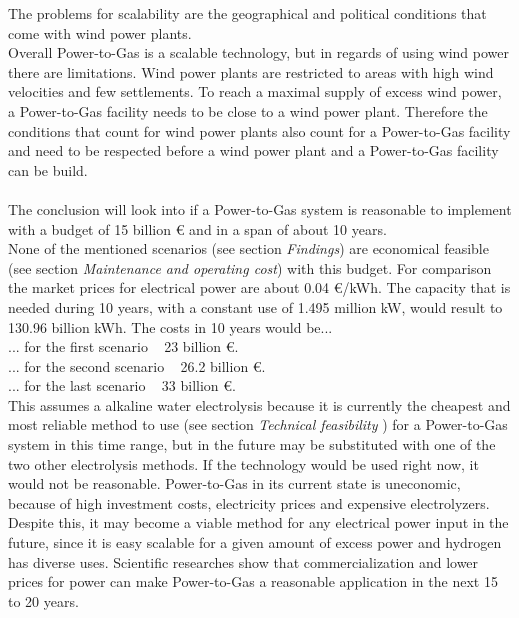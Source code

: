 \begin{parcolumns}[colwidths={1=2.5 cm, 2=10 cm, 3=2.5 cm}]{3}
{The problems for scalability are the geographical and political conditions that come with wind power plants.\\
Overall Power-to-Gas is a scalable technology, but in regards of using wind power there are limitations. Wind power plants are restricted to areas with high wind velocities and few settlements. To reach a maximal supply of excess wind power, a Power-to-Gas facility needs to be close to a wind power plant. Therefore the conditions that count for wind power plants also count for a Power-to-Gas facility and need to be respected before a wind power plant and a Power-to-Gas facility can be build.\\ \\
The conclusion will look into if a Power-to-Gas system is reasonable to implement with a budget of 15 billion \euro{ } and in a span of about 10 years.\\
None of the mentioned scenarios (see section \textit{Findings}) are economical feasible (see section \textit{Maintenance and operating cost}) with this budget. For comparison the market prices for electrical power are about 0.04 \euro /kWh. The capacity that is needed during 10 years, with a constant use of 1.495 million kW, would result to 130.96 billion kWh. The costs in 10 years would be... \\
... for the first scenario ~ 23 billion \euro .\\
... for the second scenario ~ 26.2 billion \euro .\\
... for the last scenario ~ 33 billion \euro . \\
This assumes a alkaline water electrolysis because it is currently the cheapest and most reliable method to use (see section \textit{Technical feasibility} ) for a Power-to-Gas system in this time range, but in the future may be substituted with one of the two other electrolysis methods.
If the technology would be used right now, it would not be reasonable. Power-to-Gas in its current state is uneconomic, because of high investment costs, electricity prices and expensive electrolyzers. Despite this, it may become a viable method for any electrical power input in the future, since it is easy scalable for a given amount of excess power and hydrogen has diverse uses. Scientific researches show that commercialization and lower prices for power can make Power-to-Gas a reasonable application in the next 15 to 20 years.
}


\end{parcolumns}
